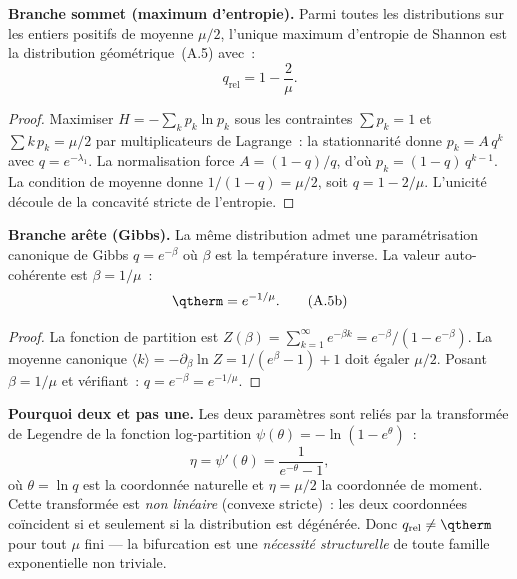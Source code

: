 \documentclass[12pt,a4paper]{article}
\providecommand{\qrel}{\ensuremath{q_{\mathrm{rel}}}}
\begin{document}
\begin{theorembox}

\textbf{Branche sommet (maximum d'entropie).}
Parmi toutes les distributions sur les entiers positifs de
moyenne $\mu/2$, l'unique maximum d'entropie de Shannon est la
distribution g\'eom\'etrique~(A.5) avec~:
\begin{equation}
  \qrel = 1 - \frac{2}{\mu}.
  \tag{A.5a}
\end{equation}

\begin{proof}
Maximiser $H = -\sum_k p_k \ln p_k$ sous les contraintes $\sum p_k = 1$
et $\sum k\,p_k = \mu/2$ par multiplicateurs de Lagrange~: la
stationnarit\'e donne $p_k = A\,q^k$ avec $q = e^{-\lambda_1}$. La
normalisation force $A = (1-q)/q$, d'o\`u $p_k = (1-q)\,q^{k-1}$.
La condition de moyenne donne $1/(1-q) = \mu/2$, soit $q = 1 - 2/\mu$.
L'unicit\'e d\'ecoule de la concavit\'e stricte de l'entropie.
\end{proof}

\textbf{Branche ar\^ete (Gibbs).}
La m\^eme distribution admet une param\'etrisation canonique de Gibbs
$q = e^{-\beta}$ o\`u $\beta$ est la temp\'erature inverse. La
valeur auto-coh\'erente est $\beta = 1/\mu$~:
\begin{equation}
  \qtherm = e^{-1/\mu}.
  \tag{A.5b}
\end{equation}

\begin{proof}
La fonction de partition est
$Z(\beta) = \sum_{k=1}^{\infty} e^{-\beta k} = e^{-\beta}/(1-e^{-\beta})$.
La moyenne canonique $\langle k \rangle = -\partial_\beta \ln Z = 1/(e^\beta - 1) + 1$
doit \'egaler $\mu/2$. Posant $\beta = 1/\mu$ et v\'erifiant~:
$q = e^{-\beta} = e^{-1/\mu}$.
\end{proof}

\textbf{Pourquoi deux et pas une.}
Les deux param\`etres sont reli\'es par la transform\'ee de Legendre
de la fonction log-partition $\psi(\theta) = -\ln(1-e^\theta)$~:
\[
  \eta = \psi'(\theta) = \frac{1}{e^{-\theta} - 1},
\]
o\`u $\theta = \ln q$ est la coordonn\'ee naturelle et $\eta = \mu/2$
la coordonn\'ee de moment. Cette transform\'ee est \emph{non lin\'eaire}
(convexe stricte)~: les deux coordonn\'ees co\"incident si et
seulement si la distribution est d\'eg\'en\'er\'ee. Donc
$\qrel \neq \qtherm$ pour tout $\mu$ fini --- la bifurcation est une
\emph{n\'ecessit\'e structurelle} de toute famille exponentielle non
triviale.
\end{theorembox}
\end{document}
